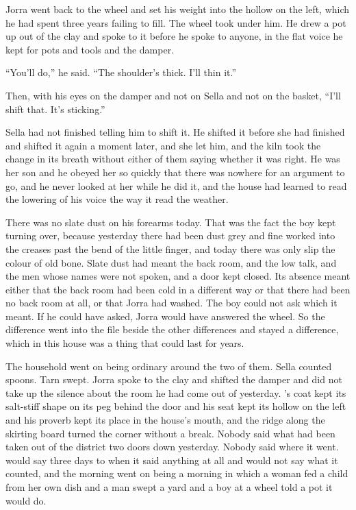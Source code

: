 \scenebreak

Jorra went back to the wheel and set his weight into the hollow on the left, which he had spent three years failing to fill. The wheel took under him. He drew a pot up out of the clay and spoke to it before he spoke to anyone, in the flat voice he kept for pots and tools and the damper.

“You'll do,” he said. “The shoulder's thick. I'll thin it.”

Then, with his eyes on the damper and not on Sella and not on the basket, “I'll shift that. It's sticking.”

Sella had not finished telling him to shift it. He shifted it before she had finished and shifted it again a moment later, and she let him, and the kiln took the change in its breath without either of them saying whether it was right. He was her son and he obeyed her so quickly that there was nowhere for an argument to go, and he never looked at her while he did it, and the house had learned to read the lowering of his voice the way it read the weather.

There was no slate dust on his forearms today. That was the fact the boy kept turning over, because yesterday there had been dust grey and fine worked into the creases past the bend of the little finger, and today there was only slip the colour of old bone. Slate dust had meant the back room, and the low talk, and the men whose names were not spoken, and a door kept closed. Its absence meant either that the back room had been cold in a different way or that there had been no back room at all, or that Jorra had washed. The boy could not ask which it meant. If he could have asked, Jorra would have answered the wheel. So the difference went into the file beside the other differences and stayed a difference, which in this house was a thing that could last for years.

The household went on being ordinary around the two of them. Sella counted spoons. Tarn swept. Jorra spoke to the clay and shifted the damper and did not take up the silence about the room he had come out of yesterday. 's coat kept its salt-stiff shape on its peg behind the door and his seat kept its hollow on the left and his proverb kept its place in the house's mouth, and the ridge along the skirting board turned the corner without a break. Nobody said what had been taken out of the district two doors down yesterday. Nobody said where it went.  would say three days to  when it said anything at all and would not say what it counted, and the morning went on being a morning in which a woman fed a child from her own dish and a man swept a yard and a boy at a wheel told a pot it would do.

